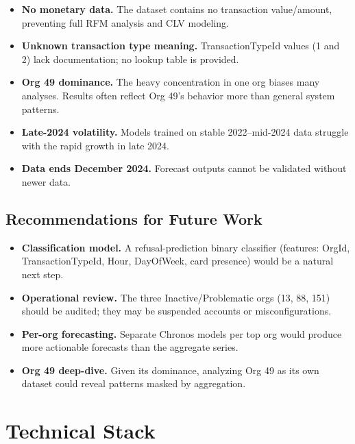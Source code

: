 \documentclass[11pt,a4paper]{article}
\begin{document}
\begin{itemize}
    \item \textbf{No monetary data.} The dataset contains no transaction value/amount, preventing full RFM analysis and CLV modeling.
    \item \textbf{Unknown transaction type meaning.} TransactionTypeId values (1 and 2) lack documentation; no lookup table is provided.
    \item \textbf{Org 49 dominance.} The heavy concentration in one org biases many analyses. Results often reflect Org 49's behavior more than general system patterns.
    \item \textbf{Late-2024 volatility.} Models trained on stable 2022--mid-2024 data struggle with the rapid growth in late 2024.
    \item \textbf{Data ends December 2024.} Forecast outputs cannot be validated without newer data.
\end{itemize}

\subsection{Recommendations for Future Work}

\begin{itemize}
    \item \textbf{Classification model.} A refusal-prediction binary classifier (features: OrgId, TransactionTypeId, Hour, DayOfWeek, card presence) would be a natural next step.
    \item \textbf{Operational review.} The three Inactive/Problematic orgs (13, 88, 151) should be audited; they may be suspended accounts or misconfigurations.
    \item \textbf{Per-org forecasting.} Separate Chronos models per top org would produce more actionable forecasts than the aggregate series.
    \item \textbf{Org 49 deep-dive.} Given its dominance, analyzing Org 49 as its own dataset could reveal patterns masked by aggregation.
\end{itemize}

\section{Technical Stack}
\end{document}
